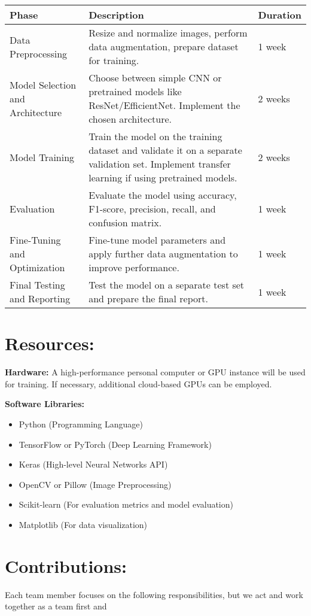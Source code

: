 \documentclass[12pt]{article}
\begin{document}
\begin{tabular}{|l|l|l|}
\hline
\textbf{Phase} & \textbf{Description} & \textbf{Duration} \\
\hline
Data Preprocessing & Resize and normalize images, perform data augmentation, prepare dataset for training. & 1 week \\
\hline
Model Selection and Architecture & Choose between simple CNN or pretrained models like ResNet/EfficientNet. Implement the chosen architecture. & 2 weeks \\
\hline
Model Training & Train the model on the training dataset and validate it on a separate validation set. Implement transfer learning if using pretrained models. & 2 weeks \\
\hline
Evaluation & Evaluate the model using accuracy, F1-score, precision, recall, and confusion matrix. & 1 week \\
\hline
Fine-Tuning and Optimization & Fine-tune model parameters and apply further data augmentation to improve performance. & 1 week \\
\hline
Final Testing and Reporting & Test the model on a separate test set and prepare the final report. & 1 week \\
\hline
\end{tabular}



\section*{Resources:}
\textbf{Hardware:} A high-performance personal computer or GPU instance will be used for training. If necessary, additional cloud-based GPUs can be employed.



\textbf{Software Libraries:}
\begin{itemize}
    \item Python (Programming Language)
    \item TensorFlow or PyTorch (Deep Learning Framework)
    \item Keras (High-level Neural Networks API)
    \item OpenCV or Pillow (Image Preprocessing)
    \item Scikit-learn (For evaluation metrics and model evaluation)
    \item Matplotlib (For data visualization)
\end{itemize}



\section*{Contributions:}
Each team member focuses on the following responsibilities, but we act and work together as a team first and 
 
\end{document}
